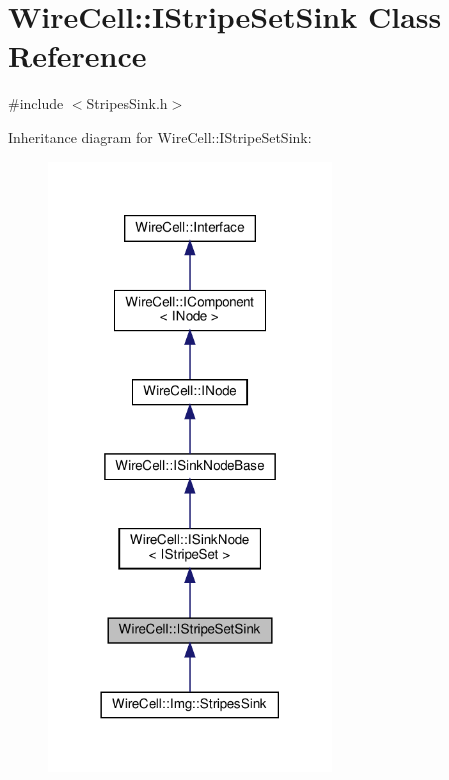 \hypertarget{class_wire_cell_1_1_i_stripe_set_sink}{}\section{Wire\+Cell\+:\+:I\+Stripe\+Set\+Sink Class Reference}
\label{class_wire_cell_1_1_i_stripe_set_sink}


{\ttfamily \#include $<$Stripes\+Sink.\+h$>$}



Inheritance diagram for Wire\+Cell\+:\+:I\+Stripe\+Set\+Sink\+:
\nopagebreak
\begin{figure}[H]
\begin{center}
\leavevmode
\includegraphics[width=213pt]{class_wire_cell_1_1_i_stripe_set_sink__inherit__graph}
\end{center}
\end{figure}


